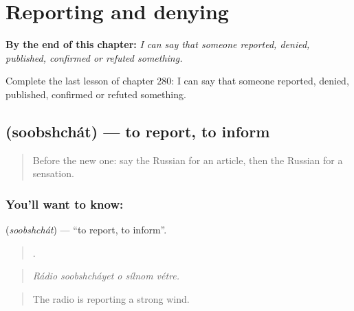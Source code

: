 
\chapter{Reporting and denying}
\label{ch:ru-reporting-and-denying}

\begin{chapteropening}
\textbf{By the end of this chapter:} \emph{I can say that someone reported, denied, published, confirmed or refuted something.}

Complete the last lesson of chapter 280: I can say that someone reported, denied, published, confirmed or refuted something.
\end{chapteropening}

\section[\texorpdfstring{\ru{сообщать} (soobshchát)}{сообщать (soobshchát)}]{ (soobshchát) — to report, to inform}

\label{lesson:RU-C280-soobshchat}



\begin{quote}
Before the new one: say the Russian for an article, then the Russian for a sensation.
\end{quote}

\subsection*{You'll want to know: }
\textbf{} (\emph{soobshchát}) — \textquotedblleft{}to report, to inform\textquotedblright{}.

\begin{quote}
    .
\end{quote}

\begin{quote}
\emph{Rádio soobshcháyet o sílnom vétre.}
\end{quote}

\begin{quote}
The radio is reporting a strong wind.
\end{quote}

